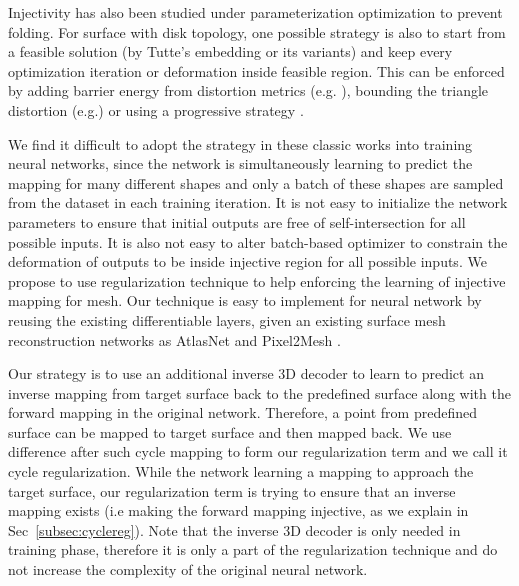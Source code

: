 Injectivity has also been studied under parameterization optimization to prevent folding. For surface with disk topology, one possible strategy is also to start from a feasible solution (by Tutte's embedding \cite{tutte} or its variants) and keep every optimization iteration or deformation inside feasible region. This can be enforced by adding barrier energy from distortion metrics (e.g. \cite{provableplanarmapping,lifted_bijection}), bounding the triangle distortion (e.g.\cite{freeboundary,boundeddistortion})
or using a progressive strategy \cite{Liu_PP_2018}. 

We find it difficult to adopt the strategy in these classic works into training neural networks, since the network is simultaneously learning to predict the mapping for many different shapes and only a batch of these shapes are sampled from the dataset in each training iteration. It is not easy to initialize the network parameters to ensure that initial outputs are free of self-intersection for all possible inputs. It is also not easy to alter batch-based optimizer to constrain the deformation of outputs to be inside injective region for all possible inputs. We propose to use regularization technique to help enforcing the learning of injective mapping for mesh. Our technique is easy to implement for neural network by reusing the existing differentiable layers, given an existing surface mesh reconstruction networks as AtlasNet \cite{atlasnet} and Pixel2Mesh \cite{pixel2mesh}.

 Our strategy is to use an additional inverse 3D decoder to learn to predict an inverse mapping from target surface back to the predefined surface along with the forward mapping in the original network. Therefore, a point from predefined surface can be mapped to target surface and then mapped back. We use difference after such cycle mapping to form our regularization term and we call it cycle regularization. While the network learning a mapping to approach the target surface, our regularization term is trying to ensure that an inverse mapping exists (i.e making the forward mapping injective, as we explain in Sec~\ref{subsec:cyclereg}).
Note that the inverse 3D decoder is only needed in training phase, therefore it is only a part of the regularization technique and do not increase the complexity of the original neural network.

